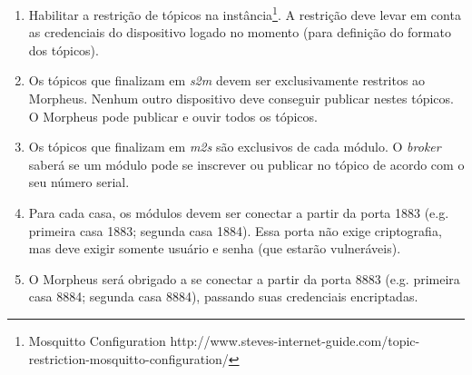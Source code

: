 \begin{enumerate}
\item Habilitar a restrição de tópicos na instância\footnote{Mosquitto Configuration http://www.steves-internet-guide.com/topic-restriction-mosquitto-configuration/}. A restrição deve levar em conta as credenciais do dispositivo logado no momento (para definição do formato dos tópicos).

\item Os tópicos que finalizam em \emph{s2m} devem ser exclusivamente restritos ao Morpheus. Nenhum outro dispositivo deve conseguir publicar nestes tópicos. O Morpheus pode publicar e ouvir todos os tópicos.

\item Os tópicos que finalizam em \emph{m2s} são exclusivos de cada módulo. O \emph{broker} saberá se um módulo pode se inscrever ou publicar no tópico de acordo com o seu número serial.

\item Para cada casa, os módulos devem ser conectar a partir da porta 1883 (e.g. primeira casa \textrightarrow{} 1883; segunda casa \textrightarrow{} 1884). Essa porta não exige criptografia, mas deve exigir somente usuário e senha (que estarão vulneráveis).

\item O Morpheus será obrigado a se conectar a partir da porta 8883 (e.g. primeira casa \textrightarrow{} 8884; segunda casa \textrightarrow{} 8884), passando suas credenciais encriptadas.
\end{enumerate}

